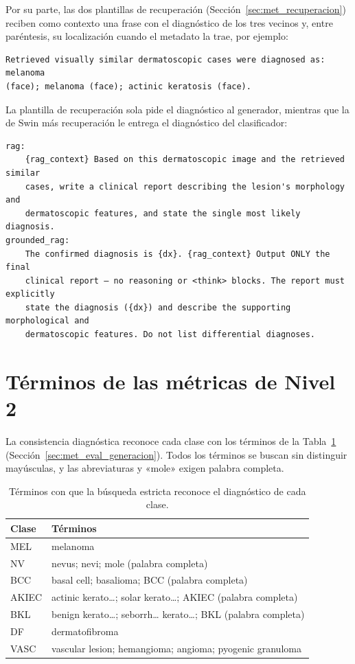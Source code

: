Por su parte, las dos plantillas de recuperación (Sección~\ref{sec:met_recuperacion}) reciben como contexto una frase
con el diagnóstico de los tres vecinos y, entre paréntesis, su localización cuando el metadato la trae, por
ejemplo:
\begin{verbatim}
Retrieved visually similar dermatoscopic cases were diagnosed as: melanoma
(face); melanoma (face); actinic keratosis (face).
\end{verbatim}
La plantilla de recuperación sola pide el diagnóstico al generador, mientras que la de Swin más recuperación
le entrega el diagnóstico del clasificador:
\begin{verbatim}
rag:
    {rag_context} Based on this dermatoscopic image and the retrieved similar
    cases, write a clinical report describing the lesion's morphology and
    dermatoscopic features, and state the single most likely diagnosis.
grounded_rag:
    The confirmed diagnosis is {dx}. {rag_context} Output ONLY the final
    clinical report — no reasoning or <think> blocks. The report must explicitly
    state the diagnosis ({dx}) and describe the supporting morphological and
    dermatoscopic features. Do not list differential diagnoses.
\end{verbatim}

\section{Términos de las métricas de Nivel 2}

La consistencia diagnóstica reconoce cada clase con los términos de la Tabla~\ref{tab:ap_terminos_dx}
(Sección~\ref{sec:met_eval_generacion}). Todos los términos se buscan sin distinguir mayúsculas, y las abreviaturas y «mole» exigen palabra completa.

\begin{table}[H]
    \centering
    \caption{Términos con que la búsqueda estricta reconoce el diagnóstico de cada clase.}
    \label{tab:ap_terminos_dx}
    \small
    \begin{tabularx}{\textwidth}{@{}>{\raggedright\arraybackslash}p{2.2cm}>{\raggedright\arraybackslash}X@{}}
        \toprule
        \textbf{Clase} & \textbf{Términos} \\
        \midrule
        MEL & melanoma \\
        \filasep
        NV & nevus; nevi; mole (palabra completa) \\
        \filasep
        BCC & basal cell; basalioma; BCC (palabra completa) \\
        \filasep
        AKIEC & actinic kerato…; solar kerato…; AKIEC (palabra completa) \\
        \filasep
        BKL & benign kerato…; seborrh… kerato…; BKL (palabra completa) \\
        \filasep
        DF & dermatofibroma \\
        \filasep
        VASC & vascular lesion; hemangioma; angioma; pyogenic granuloma \\
        \bottomrule
    \end{tabularx}
\end{table}

